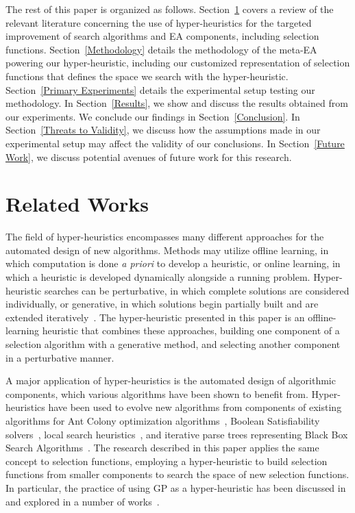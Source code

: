 \documentclass[sigconf]{acmart}
\begin{document}
The rest of this paper is organized as follows. Section~\ref{Literature Review} covers a review of the relevant literature concerning the use of hyper-heuristics for the targeted improvement of search algorithms and EA components, including selection functions. Section~\ref{Methodology} details the methodology of the meta-EA powering our hyper-heuristic, including our customized representation of selection functions that defines the space we search with the hyper-heuristic.  Section~\ref{Primary Experiments} details the experimental setup testing our methodology. In Section~\ref{Results}, we show and discuss the results obtained from our experiments. We conclude our findings in Section~\ref{Conclusion}. In Section~\ref{Threats to Validity}, we discuss how the assumptions made in our experimental setup may affect the validity of our conclusions. In Section~\ref{Future Work}, we discuss potential avenues of future work for this research.

\section{Related Works}
\label{Literature Review}
The field of hyper-heuristics encompasses many different approaches for the automated design of new algorithms. Methods may utilize offline learning, in which computation is done \textit{a priori} to develop a heuristic, or online learning, in which a heuristic is developed dynamically alongside a running problem. Hyper-heuristic searches can be perturbative, in which complete solutions are considered individually, or generative, in which solutions begin partially built and are extended iteratively~\citep{burke2013HHstateoftheart}. The hyper-heuristic presented in this paper is an offline-learning heuristic that combines these approaches, building one component of a selection algorithm with a generative method, and selecting another component in a perturbative manner.

A major application of hyper-heuristics is the automated design of algorithmic components, which various algorithms have been shown to benefit from. Hyper-heuristics have been used to evolve new algorithms from components of existing algorithms for Ant Colony optimization algorithms~\citep{lopez2012antcol}, Boolean Satisfiability solvers~\citep{khudabukhsh2009satenstein}, local search heuristics~\citep{burke2012localHeuristics}, and iterative parse trees representing Black Box Search Algorithms~\citep{martin2013evolvingBBSA}. The research described in this paper applies the same concept to selection functions, employing a hyper-heuristic to build selection functions from smaller components to search the space of new selection functions. In particular, the practice of using GP as a hyper-heuristic has been discussed in~\citep{burke2009exploring} and explored in a number of works~\citep{burke2010strippacking, burke2006binpacking, harris2015comparison}. 
\end{document}
